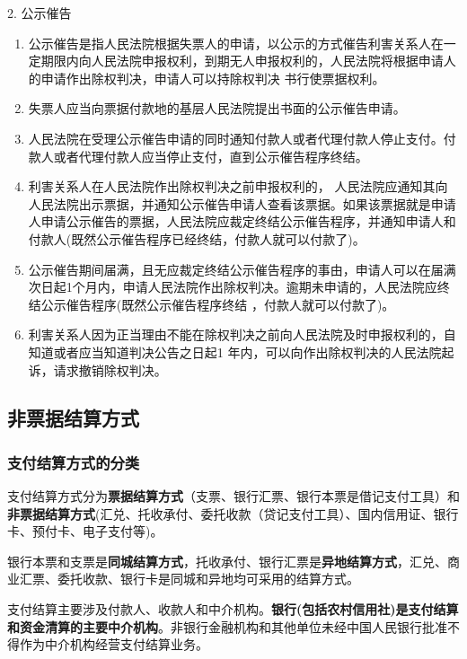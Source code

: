 \documentclass[UTF8,12pt]{ctexart}
\numberwithin{equation}{section} %
\numberwithin{figure}{section}
\numberwithin{table}{section}
\begin{document}
	
	2. 公示催告
	\begin{enumerate}
		\item 公示催告是指人民法院根据失票人的申请，以公示的方式催告利害关系人在一定期限内向人民法院申报权利，到期无人申报权利的，人民法院将根据申请人的申请作出除权判决，申请人可以持除权判决 书行使票据权利。
		
		\item 失票人应当向票据付款地的基层人民法院提出书面的公示催告申请。
		
		\item 人民法院在受理公示催告申请的同时通知付款人或者代理付款人停止支付。付款人或者代理付款人应当停止支付，直到公示催告程序终结。
		
		\item 利害关系人在人民法院作出除权判决之前申报权利的， 人民法院应通知其向人民法院出示票据，并通知公示催告申请人查看该票据。如果该票据就是申请人申请公示催告的票据，人民法院应裁定终结公示催告程序，并通知申请人和付款人(既然公示催告程序已经终结，付款人就可以付款了)。
		
		\item 公示催告期间届满，且无应裁定终结公示催告程序的事由，申请人可以在届满次日起1个月内，申请人民法院作出除权判决。逾期未申请的，人民法院应终结公示催告程序(既然公示催告程序终结 ，付款人就可以付款了)。
		
		\item 利害关系人因为正当理由不能在除权判决之前向人民法院及时申报权利的，自知道或者应当知道判决公告之日起1 年内，可以向作出除权判决的人民法院起诉，请求撤销除权判决。
	\end{enumerate}

	\subsection{非票据结算方式}
	
	\subsubsection{支付结算方式的分类} 
	支付结算方式分为\textbf{票据结算方式}（支票、银行汇票、银行本票是借记支付工具）和\textbf{非票据结算方式}(汇兑、托收承付、委托收款（贷记支付工具）、国内信用证、银行卡、预付卡、电子支付等)。
	
	银行本票和支票是\textbf{同城结算方式}，托收承付、银行汇票是\textbf{异地结算方式}，汇兑、商业汇票、委托收款、银行卡是同城和异地均可采用的结算方式。
	
	支付结算主要涉及付款人、收款人和中介机构。\textbf{银行(包括农村信用社)是支付结算和资金清算的主要中介机构}。非银行金融机构和其他单位未经中国人民银行批准不得作为中介机构经营支付结算业务。
	
\end{document}
